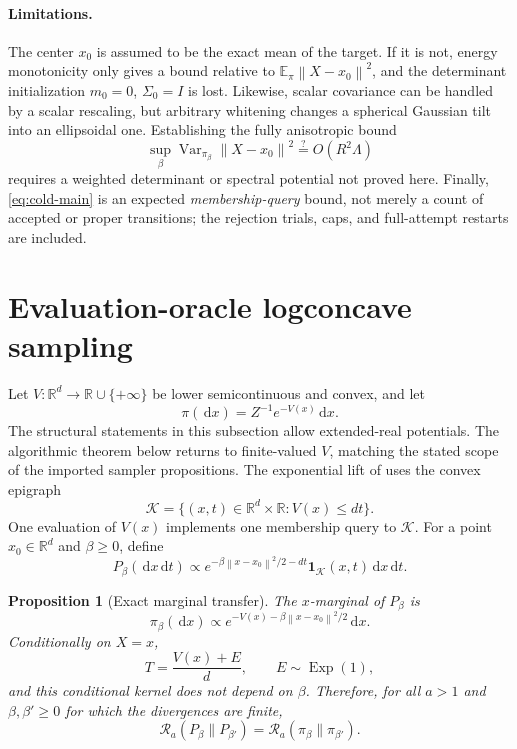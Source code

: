 \documentclass[11pt]{article}
\newtheorem{proposition}[theorem]{Proposition}
\theoremstyle{remark}
\newcommand{\R}{\mathbb R}
\newcommand{\E}{\mathbb E}
\newcommand{\1}{\bm 1}
\newcommand{\Var}{\operatorname{Var}}
\newcommand{\dd}{\,\mathrm d}
\newcommand{\norm}[1]{\left\lVert #1\right\rVert}
\begin{document}
\paragraph{Limitations.}
The center $x_0$ is assumed to be the exact mean of the target.  If it
is not, energy monotonicity only gives a bound relative to
$\E_\pi\norm{X-x_0}^2$, and the determinant initialization
$m_0=0$, $\Sigma_0=I$ is lost.  Likewise, scalar covariance can be
handled by a scalar rescaling, but arbitrary whitening changes a
spherical Gaussian tilt into an ellipsoidal one.  Establishing the
fully anisotropic bound
\[
  \sup_\beta\Var_{\pi_\beta}\norm{X-x_0}^2
  \stackrel{?}{=}O(R^2\Lambda)
\]
requires a weighted determinant or spectral potential not proved here.
Finally, \eqref{eq:cold-main} is an expected \emph{membership-query}
bound, not merely a count of accepted or proper transitions; the
rejection trials, caps, and full-attempt restarts are included.

\section{Evaluation-oracle logconcave sampling}
\label{sec:lift}

Let $V:\R^d\to\R\cup\{+\infty\}$ be lower semicontinuous and convex,
and let
\[
  \pi(\dd x)=Z^{-1}e^{-V(x)}\dd x.
\]
The structural statements in this subsection allow extended-real
potentials.  The algorithmic theorem below returns to finite-valued
$V$, matching the stated scope of the imported sampler propositions.
The exponential lift of \citet{KV25sampling,KV26zeroth} uses the convex
epigraph
\begin{equation}\label{eq:lift-body}
  \mathcal K=\{(x,t)\in\R^d\times\R:V(x)\leq dt\}.
\end{equation}
One evaluation of $V(x)$ implements one membership query to
$\mathcal K$.  For a point $x_0\in\R^d$ and $\beta\geq0$, define
\begin{equation}\label{eq:lift-anneal}
  P_\beta(\dd x\dd t)
  \propto
  e^{-\beta\norm{x-x_0}^2/2-dt}
  \1_{\mathcal K}(x,t)\dd x\dd t.
\end{equation}

\begin{proposition}[Exact marginal transfer]
\label{prop:lift-transfer}
The $x$-marginal of $P_\beta$ is
\[
  \pi_\beta(\dd x)
  \propto e^{-V(x)-\beta\norm{x-x_0}^2/2}\dd x.
\]
Conditionally on $X=x$,
\[
  T=\frac{V(x)+E}{d},
  \qquad E\sim\operatorname{Exp}(1),
\]
and this conditional kernel does not depend on $\beta$.  Therefore, for
all $a>1$ and $\beta,\beta'\geq0$ for which the divergences are finite,
\begin{equation}\label{eq:lift-renyi-equality}
  \mathcal R_a(P_\beta\|P_{\beta'})
  =\mathcal R_a(\pi_\beta\|\pi_{\beta'}).
\end{equation}
\end{proposition}
\end{document}
